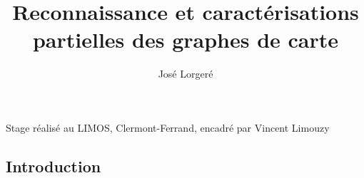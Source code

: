 \documentclass{scrartcl}
\begin{document}
\title{Reconnaissance et caractérisations partielles des graphes de carte }

\author{José Lorgeré}

\maketitle
\thispagestyle{empty}

\begin{center}
    Stage réalisé au LIMOS, Clermont-Ferrand, encadré par Vincent Limouzy
\end{center}

\begin{flushleft}

\tableofcontents

\newpage
\setcounter{page}{1} 

\section*{Introduction}


\end{flushleft}
\end{document}

